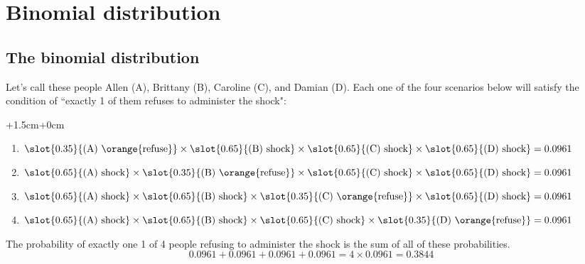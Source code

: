 
\section{Binomial distribution}


\subsection{The binomial distribution}


\begin{frame}

\pause
Let's call these people Allen (A), Brittany (B), Caroline (C), and Damian (D). Each one of the four scenarios below will satisfy the condition of ``exactly 1 of them refuses to administer the shock": \\
\vspace{0.25cm}
\pause
\begin{changemargin}{+1.5cm}{+0cm}
{\footnotesize
\begin{enumerate}
\item[Scenario 1:] $\slot{0.35}{\text{(A) \orange{refuse}}} \times \slot{0.65}{\text{(B) shock}} \times \slot{0.65}{\text{(C) shock}} \times \slot{0.65}{\text{(D) shock}} = 0.0961$
\pause
\item[Scenario 2:] $\slot{0.65}{\text{(A) shock}} \times \slot{0.35}{\text{(B) \orange{refuse}}}\times \slot{0.65}{\text{(C) shock}} \times \slot{0.65}{\text{(D) shock}} = 0.0961$
\pause
\item[Scenario 3:] $\slot{0.65}{\text{(A) shock}} \times \slot{0.65}{\text{(B) shock}} \times \slot{0.35}{\text{(C) \orange{refuse}}}\times \slot{0.65}{\text{(D) shock}} = 0.0961$
\pause
\item[Scenario 4:] $\slot{0.65}{\text{(A) shock}} \times \slot{0.65}{\text{(B) shock}} \times \slot{0.65}{\text{(C) shock}} \times \slot{0.35}{\text{(D) \orange{refuse}}} = 0.0961$
\end{enumerate}
}
\end{changemargin}
\pause
The probability of exactly one 1 of 4 people refusing to administer the shock is the sum of all of these probabilities.
\[ 0.0961+ 0.0961 + 0.0961 + 0.0961 = 4 \times 0.0961 = 0.3844 \]

\end{frame}

